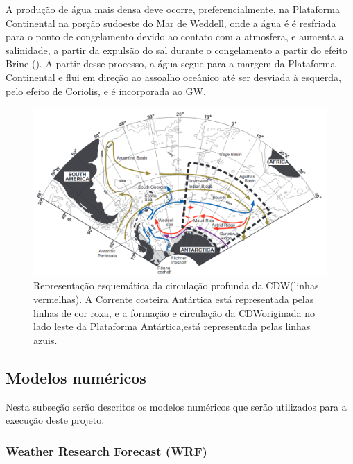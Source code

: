 \documentclass{article}
\begin{document}
  A produção de água mais densa deve ocorre, preferencialmente, na Plataforma Continental na porção sudoeste do Mar de Weddell, onde a água é
é resfriada para o ponto de congelamento devido ao contato com a atmosfera, e aumenta a salinidade, a partir da expulsão do sal durante o congelamento a partir do efeito Brine 
(\cite{Vernet2019}). A partir desse processo, a água segue para a margem da Plataforma Continental e flui em direção ao assoalho oceânico até ser desviada à esquerda,
 pelo efeito de Coriolis, e é incorporada ao GW.
\bigskip


\begin{figure}[H]
    \centering
    \includegraphics[width=1\textwidth]{img/weddell.png}
	\caption{Representação esquemática da circulação profunda da CDW(linhas vermelhas). A Corrente costeira Antártica está representada pelas linhas de cor roxa, e a formação e circulação da CDWoriginada no lado leste da Plataforma Antártica,está representada pelas linhas azuis.}
	\label{weddell}
\end{figure}
\bigskip

\subsection{Modelos numéricos}
\bigskip

Nesta subseção serão descritos os modelos numéricos que serão utilizados para a execução deste projeto.

\subsubsection{Weather Research Forecast (WRF)}
\bigskip
\end{document}
